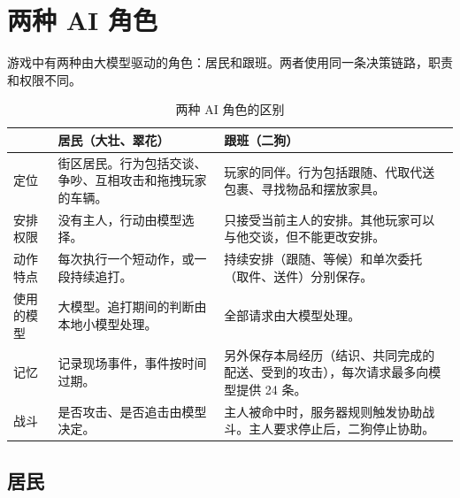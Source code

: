 \documentclass[11pt]{article}
\begin{document}
\section{两种 AI 角色}

游戏中有两种由大模型驱动的角色：居民和跟班。两者使用同一条决策链路，职责和权限不同。

\begin{table}[H]
\small
\begin{tabularx}{\textwidth}{@{}l L L@{}}
\toprule
 & \textbf{居民（大壮、翠花）} & \textbf{跟班（二狗）} \\
\midrule
定位 & 街区居民。行为包括交谈、争吵、互相攻击和拖拽玩家的车辆。 & 玩家的同伴。行为包括跟随、代取代送包裹、寻找物品和摆放家具。 \\
安排权限 & 没有主人，行动由模型选择。 & 只接受当前主人的安排。其他玩家可以与他交谈，但不能更改安排。 \\
动作特点 & 每次执行一个短动作，或一段持续追打。 & 持续安排（跟随、等候）和单次委托（取件、送件）分别保存。 \\
使用的模型 & 大模型。追打期间的判断由本地小模型处理。 & 全部请求由大模型处理。 \\
记忆 & 记录现场事件，事件按时间过期。 & 另外保存本局经历（结识、共同完成的配送、受到的攻击），每次请求最多向模型提供 24 条。 \\
战斗 & 是否攻击、是否追击由模型决定。 & 主人被命中时，服务器规则触发协助战斗。主人要求停止后，二狗停止协助。 \\
\bottomrule
\end{tabularx}
\caption{两种 AI 角色的区别}
\end{table}

\subsection{居民}
\end{document}
